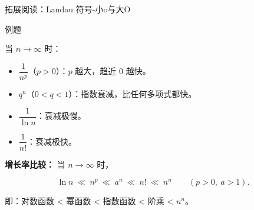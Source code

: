 \documentclass[aspectratio=169,10pt,fontset=fandol]{ctexbeamer}
\newenvironment{custom}[1]{\par\noindent\textbf{#1}\quad}{\par\vspace{0.8em}}
\begin{document}
\begin{frame}[t,fragile]{拓展阅读：Landau 符号-小o与大O}
\normalsize
\begin{block}{例题}
{\normalsize


当 \(n \to \infty\) 时：

\begin{itemize}

\item \(\dfrac{1}{n^p}\)（\(p>0\)）：\(p\) 越大，趋近 0 越快。

\item \(q^n\)（\(0 < q < 1\)）：指数衰减，比任何多项式都快。

\item \(\dfrac{1}{\ln n}\)：衰减极慢。

\item \(\dfrac{1}{n!}\)：衰减极快。

\end{itemize}



\textbf{增长率比较：} 当 \(n \to \infty\) 时，

\[

\ln n \ \ll\ n^p \ \ll\ a^n \ \ll\ n! \ \ll\ n^n \qquad (p>0,\ a>1).

\]

即：对数函数 < 幂函数 < 指数函数 < 阶乘 < \(n^n\)。


}
\end{block}
\end{frame}
\end{document}
